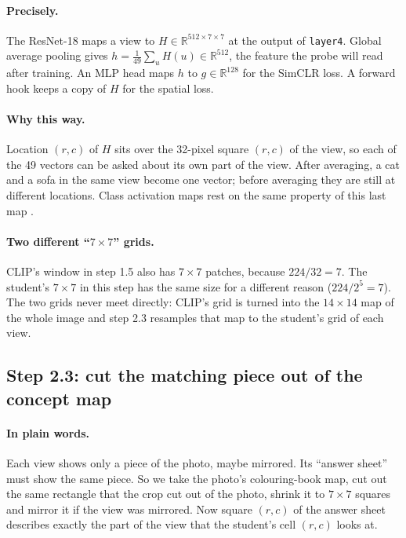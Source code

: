 \documentclass[11pt]{article}
\newcommand{\plain}{\paragraph{In plain words.}}
\newcommand{\precise}{\paragraph{Precisely.}}
\newcommand{\why}{\paragraph{Why this way.}}
\begin{document}
\precise The ResNet-18 \citep{he2016resnet} maps a view to $H\in\mathbb R^{512\times7\times7}$ at the output of
\texttt{layer4}. Global average pooling gives $h=\frac1{49}\sum_u H(u)\in\mathbb R^{512}$, the feature the probe will
read after training. An MLP head maps $h$ to $g\in\mathbb R^{128}$ for the SimCLR loss. A forward hook keeps a copy of
$H$ for the spatial loss.

\why Location $(r,c)$ of $H$ sits over the 32-pixel square $(r,c)$ of the view, so each of the 49 vectors can be
asked about its own part of the view. After averaging, a cat and a sofa in the same view become one vector; before
averaging they are still at different locations. Class activation maps rest on the same property of this last map
\citep{zhou2016cam}.

\paragraph{Two different ``$7\times7$'' grids.} CLIP's window in step 1.5 also has $7\times7$ patches, because
$224/32=7$. The student's $7\times7$ in this step has the same size for a different reason ($224/2^5=7$). The two
grids never meet directly: CLIP's grid is turned into the $14\times14$ map of the whole image and step 2.3 resamples
that map to the student's grid of each view.

\subsection{Step 2.3: cut the matching piece out of the concept map}
\plain Each view shows only a piece of the photo, maybe mirrored. Its ``answer sheet'' must show the same piece. So we
take the photo's colouring-book map, cut out the same rectangle that the crop cut out of the photo, shrink it to
$7\times7$ squares and mirror it if the view was mirrored. Now square $(r,c)$ of the answer sheet describes exactly
the part of the view that the student's cell $(r,c)$ looks at.
\end{document}
